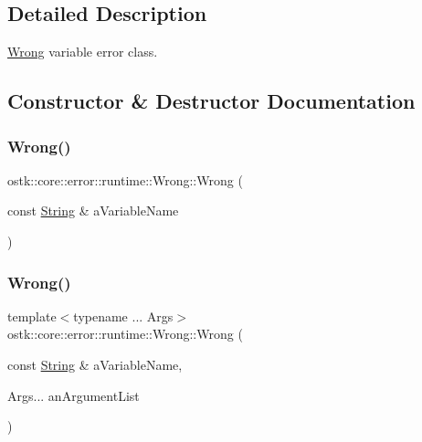 \subsection{Detailed Description}
\hyperlink{classostk_1_1core_1_1error_1_1runtime_1_1_wrong}{Wrong} variable error class. 

\subsection{Constructor \& Destructor Documentation}
\mbox{\label{classostk_1_1core_1_1error_1_1runtime_1_1_wrong_a2e065c6ffb3877dd93fc36e897a54137}} 
\subsubsection{\texorpdfstring{Wrong()}{Wrong()}\hspace{0.1cm}{\footnotesize\ttfamily [1/2]}}
{\footnotesize\ttfamily ostk\+::core\+::error\+::runtime\+::\+Wrong\+::\+Wrong (\begin{DoxyParamCaption}\item[{const \hyperlink{classostk_1_1core_1_1types_1_1_string}{String} \&}]{a\+Variable\+Name }\end{DoxyParamCaption})}

\mbox{\label{classostk_1_1core_1_1error_1_1runtime_1_1_wrong_ac517c931c12598eed5d6b06272cfa303}} 
\subsubsection{\texorpdfstring{Wrong()}{Wrong()}\hspace{0.1cm}{\footnotesize\ttfamily [2/2]}}
{\footnotesize\ttfamily template$<$typename ... Args$>$ \\
ostk\+::core\+::error\+::runtime\+::\+Wrong\+::\+Wrong (\begin{DoxyParamCaption}\item[{const \hyperlink{classostk_1_1core_1_1types_1_1_string}{String} \&}]{a\+Variable\+Name,  }\item[{Args...}]{an\+Argument\+List }\end{DoxyParamCaption})\hspace{0.3cm}{\ttfamily [inline]}}

